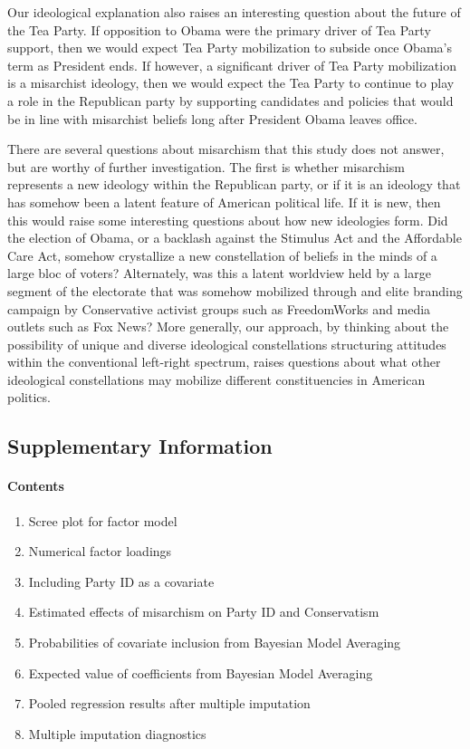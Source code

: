 \documentclass[12pt,]{article}
\begin{document}
Our ideological explanation also raises an interesting question about
the future of the Tea Party. If opposition to Obama were the primary
driver of Tea Party support, then we would expect Tea Party mobilization
to subside once Obama's term as President ends. If however, a
significant driver of Tea Party mobilization is a misarchist ideology,
then we would expect the Tea Party to continue to play a role in the
Republican party by supporting candidates and policies that would be in
line with misarchist beliefs long after President Obama leaves office.

There are several questions about misarchism that this study does not
answer, but are worthy of further investigation. The first is whether
misarchism represents a new ideology within the Republican party, or if
it is an ideology that has somehow been a latent feature of American
political life. If it is new, then this would raise some interesting
questions about how new ideologies form. Did the election of Obama, or a
backlash against the Stimulus Act and the Affordable Care Act, somehow
crystallize a new constellation of beliefs in the minds of a large bloc
of voters? Alternately, was this a latent worldview held by a large
segment of the electorate that was somehow mobilized through and elite
branding campaign by Conservative activist groups such as FreedomWorks
and media outlets such as Fox News? More generally, our approach, by
thinking about the possibility of unique and diverse ideological
constellations structuring attitudes within the conventional left-right
spectrum, raises questions about what other ideological constellations
may mobilize different constituencies in American politics.

\pagebreak

\subsection{Supplementary Information}\label{supplementary-information}

\paragraph{Contents}\label{contents}

\begin{enumerate}
\def\labelenumi{\arabic{enumi}.}
\itemsep1pt\parskip0pt
\item
  Scree plot for factor model
\item
  Numerical factor loadings
\item
  Including Party ID as a covariate
\item
  Estimated effects of misarchism on Party ID and Conservatism
\item
  Probabilities of covariate inclusion from Bayesian Model Averaging
\item
  Expected value of coefficients from Bayesian Model Averaging
\item
  Pooled regression results after multiple imputation
\item
  Multiple imputation diagnostics
\end{enumerate}
\end{document}
